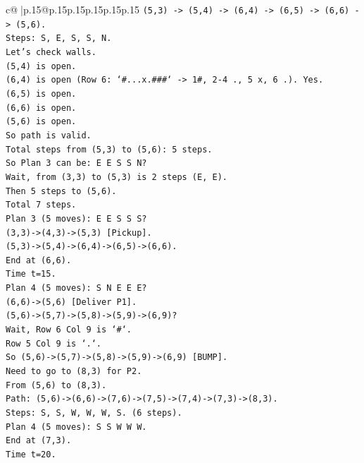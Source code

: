 \documentclass{article}
\begin{document}
{\begin{supertabular}{c@{$\;$}|p{.15\linewidth}@{}p{.15\linewidth}p{.15\linewidth}p{.15\linewidth}p{.15\linewidth}p{.15\linewidth}}
{{{\texttt{(5,3) {-}> (5,4) {-}> (6,4) {-}> (6,5) {-}> (6,6) {-}> (5,6).} \\
\texttt{Steps: S, E, S, S, N.} \\
\texttt{Let's check walls.} \\
\texttt{(5,4) is open.} \\
\texttt{(6,4) is open (Row 6: `\#...x.\#\#\#` {-}> 1\#, 2{-}4 ., 5 x, 6 .). Yes.} \\
\texttt{(6,5) is open.} \\
\texttt{(6,6) is open.} \\
\texttt{(5,6) is open.} \\
\texttt{So path is valid.} \\
\texttt{Total steps from (5,3) to (5,6): 5 steps.} \\
\texttt{So Plan 3 can be: E E S S N?} \\
\texttt{Wait, from (3,3) to (5,3) is 2 steps (E, E).} \\
\texttt{Then 5 steps to (5,6).} \\
\texttt{Total 7 steps.} \\
\texttt{Plan 3 (5 moves): E E S S S?} \\
\texttt{(3,3){-}>(4,3){-}>(5,3) {[}Pickup{]}.} \\
\texttt{(5,3){-}>(5,4){-}>(6,4){-}>(6,5){-}>(6,6).} \\
\texttt{End at (6,6).} \\
\texttt{Time t=15.} \\
\texttt{Plan 4 (5 moves): S N E E E?} \\
\texttt{(6,6){-}>(5,6) {[}Deliver P1{]}.} \\
\texttt{(5,6){-}>(5,7){-}>(5,8){-}>(5,9){-}>(6,9)?} \\
\texttt{Wait, Row 6 Col 9 is `\#`.} \\
\texttt{Row 5 Col 9 is `.`.} \\
\texttt{So (5,6){-}>(5,7){-}>(5,8){-}>(5,9){-}>(6,9) {[}BUMP{]}.} \\
\texttt{Need to go to (8,3) for P2.} \\
\texttt{From (5,6) to (8,3).} \\
\texttt{Path: (5,6){-}>(6,6){-}>(7,6){-}>(7,5){-}>(7,4){-}>(7,3){-}>(8,3).} \\
\texttt{Steps: S, S, W, W, W, S. (6 steps).} \\
\texttt{Plan 4 (5 moves): S S W W W.} \\
\texttt{End at (7,3).} \\
\texttt{Time t=20.} \\
}}}
\end{supertabular}}
\end{document}
